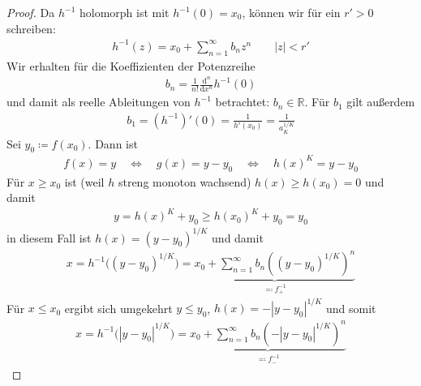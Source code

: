\begin{theorem}[Satz]
\begin{proof}
    Da $h^{-1}$ holomorph ist mit $h^{-1}(0) = x_0$, können wir für ein $r'>0$ schreiben:
    \begin{align*}
      h^{-1}(z) = x_0 + \sum_{n=1}^\infty b_n z^n
      \qquad |z| < r'
    \end{align*}
    Wir erhalten für die Koeffizienten der Potenzreihe
    \begin{align*}
      b_n = \frac 1{n!} \frac{\mathrm d^n}{\mathrm dx^n} h^{-1}(0)
    \end{align*}
    und damit als reelle Ableitungen von $h^{-1}$ betrachtet: $b_n \in \mathbb{R}$.
    Für $b_1$ gilt außerdem
    \begin{align*}
      b_1 = (h^{-1})'(0) = \frac 1{h'(x_0)} = \frac 1{a_K^{1/K}}
    \end{align*}
    Sei $y_0 \coloneq f(x_0)$.
    Dann ist
    \begin{align*}
        f(x) = y
        \quad\iff\quad g(x) = y-y_0
        \quad\iff\quad h(x)^K = y-y_0
    \end{align*}
    Für $x \ge x_0$ ist (weil $h$ streng monoton wachsend) $h(x) \ge h(x_0) = 0$ und damit
    \begin{align*}
      y = h(x)^K + y_0 \ge h(x_0)^K + y_0 = y_0
    \end{align*}
    in diesem Fall ist $h(x) = (y-y_0)^{1/K}$ und damit
    \begin{align*}
      x = h^{-1}\Big((y-y_0)^{1/K}\Big) = \underbrace{x_0 + \sum\limits_{n=1}^{\infty} b_n \left( (y-y_0)^{1/K} \right)^n}_{\eqcolon f_{+}^{-1}}
    \end{align*}
    Für $x \le x_0$ ergibt sich umgekehrt $y \le y_0$, $h(x) = -|y-y_0|^{1/K}$ und somit
    \begin{align*}
      x = h^{-1}\Big(|y-y_0|^{1/K}\Big) = \underbrace{x_0 + \sum\limits_{n=1}^{\infty} b_n \left( -|y-y_0|^{1/K} \right)^n}_{\eqcolon f_{-}^{-1}}
    \end{align*}
  \end{proof}
\end{theorem}

